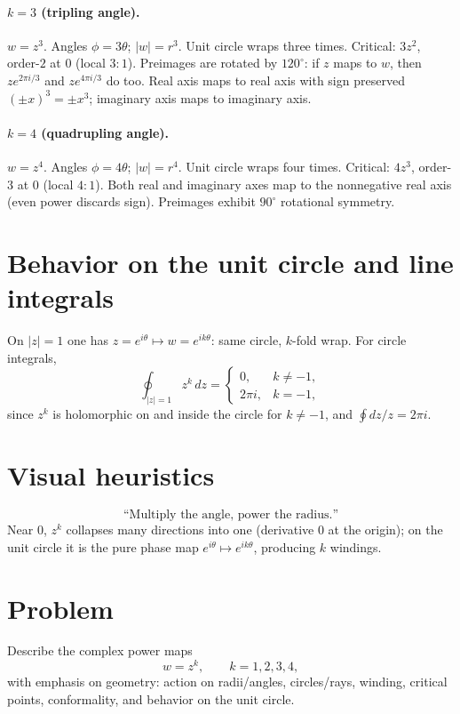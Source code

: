 \documentclass[11pt]{article}
\begin{document}
\paragraph{$k=3$ (tripling angle).}
$w=z^{3}$. Angles \(\phi=3\theta\); $\lvert w\rvert=r^{3}$.
Unit circle wraps three times. Critical: $3z^{2}$, order-$2$ at $0$ (local $3{:}1$).
Preimages are rotated by $120^\circ$: if $z$ maps to $w$, then $ze^{2\pi i/3}$ and $ze^{4\pi i/3}$ do too.
Real axis maps to real axis with sign preserved $(\pm x)^{3}=\pm x^{3}$; imaginary axis maps to imaginary axis.

\paragraph{$k=4$ (quadrupling angle).}
$w=z^{4}$. Angles \(\phi=4\theta\); $\lvert w\rvert=r^{4}$.
Unit circle wraps four times. Critical: $4z^{3}$, order-$3$ at $0$ (local $4{:}1$).
Both real and imaginary axes map to the nonnegative real axis (even power discards sign).
Preimages exhibit $90^\circ$ rotational symmetry.

\section*{Behavior on the unit circle and line integrals}
On $\lvert z\rvert=1$ one has $z=e^{i\theta}\mapsto w=e^{ik\theta}$: same circle, $k$-fold wrap.
For circle integrals,
\[
\oint_{\lvert z\rvert=1} z^{k}\,dz=
\begin{cases}
	0, & k\neq -1,\\[2pt]
	2\pi i, & k=-1,
\end{cases}
\]
since $z^{k}$ is holomorphic on and inside the circle for $k\neq -1$, and $\oint dz/z=2\pi i$.

\section*{Visual heuristics}
\[
\text{“Multiply the angle, power the radius.”}
\]
Near $0$, $z^{k}$ collapses many directions into one (derivative $0$ at the origin);
on the unit circle it is the pure phase map $e^{i\theta}\mapsto e^{ik\theta}$, producing $k$ windings.

\section*{Problem}
Describe the complex power maps
\[
w=z^{k},\qquad k=1,2,3,4,
\]
with emphasis on geometry: action on radii/angles, circles/rays, winding, critical points,
conformality, and behavior on the unit circle.
\end{document}
